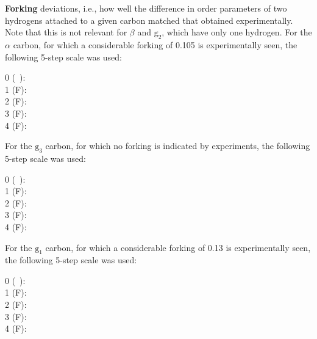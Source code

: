 \documentclass[aps,prl,superscriptaddress,twocolumn]{revtex4}
\begin{document}
{\bf Forking} deviations, i.e., how well the difference in order parameters of two hydrogens attached to a given carbon matched that obtained experimentally. Note that this is not relevant for $\beta$ and $\mathrm{g_2}$, which have only one hydrogen. For the $\alpha$ carbon,  for which a considerable forking of 0.105 is experimentally seen, the following 5-step scale was used:
\begin{description}
\item [0 (~):] 
%
\item [1 ({\textsf{\tiny F}}):] 
%
\item [2  ({\textsf{\small F}}):] 
%
\item [3 ({\textsf{\large F}}):] 
%
\item [4 ({\textsf{\Large F}}):] 
\end{description}
%
For the $\mathrm{g_3}$ carbon, for which no forking is indicated by experiments, the following 5-step scale was used:
%
\begin{description}
\item [0 (~):] 
%
\item [1 ({\textsf{\tiny F}}):] 
%
\item [2  ({\textsf{\small F}}):] 
%
\item [3 ({\textsf{\large F}}):] 
%
\item [4 ({\textsf{\Large F}}):] 
\end{description}
%
For the $\mathrm{g_1}$ carbon, for which a considerable forking of 0.13 is experimentally seen, the following 5-step scale was used:
%
\begin{description}
\item [0 (~):] 
%
\item [1 ({\textsf{\tiny F}}):] 
%
\item [2  ({\textsf{\small F}}):] 
%
\item [3 ({\textsf{\large F}}):] 
%
\item [4 ({\textsf{\Large F}}):] 
\end{description}
\end{document}
